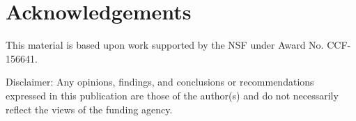 \documentclass{report}
\begin{document}
\clearpage

\tableofcontents
\listoftables
\listoffigures

\clearpage
\chapter*{Acknowledgements}

{This material is based upon work supported by the NSF under Award No. CCF-156641.\par}
\vspace{1em}
\noindent
{Disclaimer: Any opinions, findings, and conclusions or recommendations expressed in this publication are those of the author(s) and do not necessarily reflect the views of the funding agency.\par}

\clearpage
{}












{}

\end{document}
